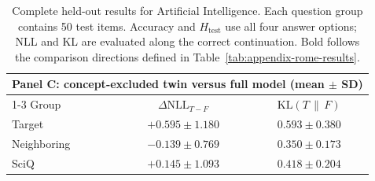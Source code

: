 \begin{table}[t]
  \vspace{1em}
  \begin{tabular}{lcc}
    \toprule
    \multicolumn{3}{l}{\textbf{Panel C: concept-excluded twin versus full model (mean $\pm$ SD)}} \\
    \cmidrule(lr){1-3}
    Group & $\Delta\mathrm{NLL}_{T-F}$ & $\mathrm{KL}(T\,\|\,F)$ \\
    \midrule
    Target      & $+0.595 \pm 1.180$ & $0.593 \pm 0.380$ \\
    Neighboring & $-0.139 \pm 0.769$ & $0.350 \pm 0.173$ \\
    SciQ        & $+0.145 \pm 1.093$ & $0.418 \pm 0.204$ \\
    \bottomrule
  \end{tabular}
  \caption{Complete held-out results for Artificial Intelligence. Each question group
  contains 50 test items. Accuracy and $H_{\mathrm{test}}$ use all four answer
  options; NLL and KL are evaluated along the correct continuation. Bold
  follows the comparison directions defined in
  Table~\ref{tab:appendix-rome-results}.}
  \label{tab:appendix-ai-results}
\end{table}

\clearpage
